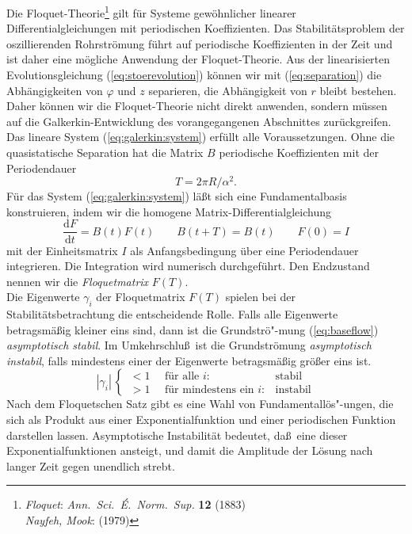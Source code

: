 \documentclass[10pt,a5paper,oneside,draft]{book}
\numberwithin{equation}{chapter}
\def\bibspace{\hspace*{18pt}}
\def\bibspace{\hspace*{21pt}}
\begin{document}
Die Floquet-\!Theorie\footnote{\label{bib:floquet}\textsl{Floquet}: \textit{Ann.\ Sci.\ {\'E}.\ Norm.\ Sup.} \textbf{12} (1883)\\\bibspace\label{bib:nayfeh_mook}\textsl{Nayfeh, Mook}: (1979)}
gilt f\"ur Systeme gew\"ohnlicher linearer Differentialgleichungen mit periodischen Koeffizienten.
Das Stabilit\"atsproblem der oszillierenden Rohrstr\"omung f\"uhrt auf periodische Koeffizienten in der Zeit und ist daher eine m\"ogliche Anwendung der Floquet-\!Theorie.
Aus der linearisierten Evolutionsgleichung (\mbox{\ref{eq:stoerevolution}}) k\"onnen wir mit (\mbox{\ref{eq:separation}}) die Abh\"angigkeiten von $\varphi$ und $z$ separieren, die Abh\"angigkeit von $r$ bleibt bestehen.
Daher k\"onnen wir die Floquet-\!Theorie nicht direkt anwenden, sondern m\"ussen auf die Galkerkin-Entwicklung des vorangegangenen Abschnittes zur\"uckgreifen.\\

Das lineare System (\mbox{\ref{eq:galerkin:system}}) erf\"ullt alle Voraussetzungen.
Ohne die quasistatische Separation hat die Matrix $B$ periodische Koeffizienten mit der Periodendauer 
\begin{equation}
	T = 2\pi R/\alpha^2.
\end{equation}
F\"ur das System (\mbox{\ref{eq:galerkin:system}}) l\"a\ss t sich eine Fundamentalbasis konstruieren, indem wir die homogene Matrix-Differentialgleichung 
\begin{equation}
	\frac{\mathrm{d} F}{\mathrm{d} t} = B(t) F(t) \qquad B(t+T) = B(t)\qquad F(0) = I
\end{equation}
mit der Einheitsmatrix $I$ als Anfangsbedingung \"uber eine Periodendauer integrieren.
Die Integration wird numerisch durchgef\"uhrt.
Den Endzustand nennen wir die \textit{Floquetmatrix} $F(T)$.\\

Die Eigenwerte $\gamma_i$ der Floquetmatrix $F(T)$ spielen bei der Stabilit\"atsbetrachtung die entscheidende Rolle.
Falls alle Eigenwerte betragsm\"a\ss ig kleiner eins sind, dann ist die Grundstr\"o"-mung (\mbox{\ref{eq:baseflow}}) \textit{asymptotisch stabil}.
Im Umkehrschlu\ss\ ist die Grundstr\"omung \textit{asymptotisch instabil}, falls mindestens einer der Eigenwerte betragsm\"a\ss ig gr\"o\ss er eins ist.
\begin{equation}\label{eq:floq:stabilitaet}
	| \gamma_i | \, \begin{cases} \,< 1 \quad \textrm{ f\"ur alle } i:& \textrm{stabil}\\
		\,> 1 \quad \textrm{ f\"ur mindestens ein } i: & \textrm{instabil}
		\end{cases}
\end{equation}
Nach dem Floquetschen Satz gibt es eine Wahl von Fundamentall\"os"-ungen, die sich als Produkt aus einer Exponentialfunktion und einer periodischen Funktion darstellen lassen.
Asymptotische Instabilit\"at bedeutet, da\ss\ eine dieser Exponentialfunktionen ansteigt, und damit die Amplitude der L\"osung nach langer Zeit gegen unendlich strebt.\\ 
\end{document}
